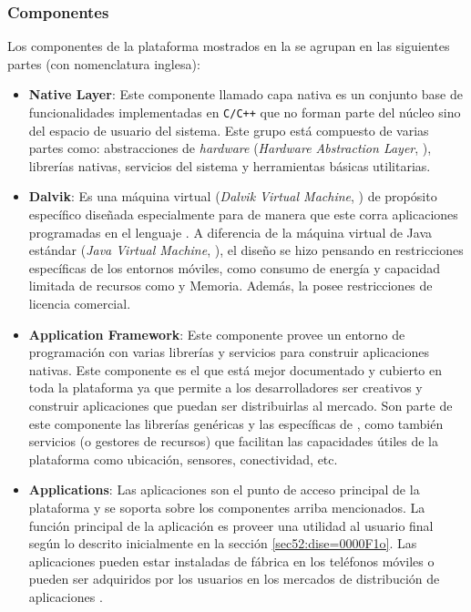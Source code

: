 \subsubsection{Componentes}

Los componentes de la plataforma mostrados en la 
se agrupan en las siguientes partes \cite{Gargenta2014} (con nomenclatura
inglesa):
\begin{itemize}
\item \textbf{Native Layer}: Este componente llamado capa nativa es un conjunto
base de funcionalidades implementadas en \texttt{C/C++} que no forman
parte del núcleo sino del espacio de usuario del sistema. Este grupo
está compuesto de varias partes como: abstracciones de \emph{hardware}
(\emph{Hardware Abstraction Layer}, ), librerías nativas,
servicios del sistema y herramientas básicas utilitarias.
\item \textbf{Dalvik}: Es una máquina virtual (\emph{Dalvik Virtual Machine},
) de propósito específico diseñada especialmente para \emph{}
de manera que este corra aplicaciones programadas en el lenguaje \emph{}
\cite{Ehringer2010}. A diferencia de la máquina virtual de Java estándar
(\emph{Java Virtual Machine}, ), el diseño se hizo pensando
en restricciones específicas de los entornos móviles, como consumo
de energía y capacidad limitada de recursos como  y Memoria.
Además, la  posee restricciones de licencia comercial.
\item \textbf{Application Framework}: Este componente provee un entorno
de programación con varias librerías y servicios para construir aplicaciones
nativas. Este componente es el que está mejor documentado y cubierto
en toda la plataforma ya que permite a los desarrolladores ser creativos
y construir aplicaciones que puedan ser distribuirlas al mercado.
Son parte de este componente las librerías \emph{ }genéricas
y las específicas de \emph{} \cite{Android2016r},
como también servicios (o gestores de recursos) que facilitan las
capacidades útiles de la plataforma como ubicación, sensores, conectividad,
etc. 
\item \textbf{Applications}: Las aplicaciones son el punto de acceso principal
de la plataforma y se soporta sobre los componentes arriba mencionados.
La función principal de la aplicación es proveer una utilidad al usuario
final según lo descrito inicialmente en la sección \ref{sec52:dise=0000F1o}.
Las aplicaciones pueden estar instaladas de fábrica en los teléfonos
móviles o pueden ser adquiridos por los usuarios en los mercados de
distribución de aplicaciones\emph{ }.
\end{itemize}

